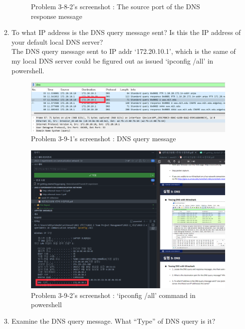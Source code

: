 \begin{enumerate}[label=\bfseries Problem \arabic*:,leftmargin=*,labelindent=1em]
\begin{figure}[!h]
        		\caption{\footnotesize Problem 3-8-2's screenshot : The source port of the DNS response message}
        		\vspace{-10pt}
            \end{figure}
        \item To what IP address is the DNS query message sent? 
        Is this the IP address of your default local DNS server?\\[0.2mm]
            \soln The DNS query message sent to IP addr ‘172.20.10.1’, which is the same of my local DNS server could be figured out as issued ‘ipconfig /all’ in powershell.
            \vspace{-2mm}  
            \begin{figure}[!h]\centering
        		\includegraphics[width=.78\textwidth]{image/result_week01/Q3-9-1.png}
        		\caption{\footnotesize Problem 3-9-1's screenshot : DNS query message}
        		\vspace{-10pt}
            \end{figure}
            \begin{figure}[!h]\centering
        		\includegraphics[width=.79\textwidth]{image/result_week01/Q3-9-2.png}
        		\caption{\footnotesize Problem 3-9-2's screenshot : ‘ipconfig /all’ command in powershell}
        		\vspace{-10pt}
            \end{figure}
        \item Examine the DNS query message. What “Type” of DNS query is it? 

\end{enumerate}
